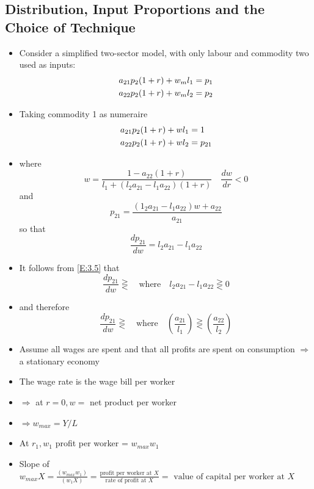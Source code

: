 \documentclass[a4paper,twoside]{article}
\numberwithin{equation}{section}
\numberwithin{figure}{section}
\begin{document}
\subsection{Distribution, Input Proportions and the Choice of Technique}
	\begin{itemize}
		\item Consider a simplified two-sector model, with only labour and commodity two used as inputs:
		\begin{align}
			a_{21}p_2 (1 + r) + w_m l_1 &= p_1 \notag \\
			a_{22}p_2 (1 + r) + w_m l_2 &= p_2 \label{E:3.1}
		\end{align}
		\item Taking commodity 1 as numeraire  
		\begin{align}
			a_{21}p_2 (1 + r) + w l_1 &= 1 \notag \\
			a_{22}p_2 (1 + r) + w l_2 &= p_{21} \label{E:3.2}
		\end{align}
		\item where
		\begin{equation}
			w = \frac{1 - a_{22} (1 + r)}{l_1 + (l_2 a_{21} - l_1 a_{22}) (1 + r)} \quad \frac{dw}{dr} < 0 \label{E:3.3}
		\end{equation}
		and
		\begin{equation}
			p_{21} = \frac{(1_2 a_{21} - l_1 a_{22}) w + a_{22}}{a_{21}} \label{E:3.4}
		\end{equation}
		so that
		\begin{equation}
			\frac{dp_{21}}{dw} = l_2 a_{21} - l_1 a_{22} \label{E:3.5}
		\end{equation}
		\item It follows from \cref{E:3.5} that
		\begin{equation}
			\frac{dp_{21}}{dw} \gtreqless \quad \text{where} \quad l_2 a_{21} - l_1 a_{22} \gtreqless 0 \label{E:3.6}
		\end{equation}
		\item and therefore
		\begin{equation}
			\frac{dp_{21}}{dw} \gtreqless \quad \text{where} \quad \left( \frac{a_{21}}{l_1} \right) \gtreqless \left( \frac{a_{22}}{l_2} \right) \label{E:3.7}
		\end{equation}
		\item Assume all wages are spent and that all profits are spent on consumption \( \Rightarrow \) a stationary economy 
		\item The wage rate is the wage bill per worker 
		\item \( \Rightarrow \) at \( r = 0, w = \) net product per worker
		\item \( \Rightarrow w_{max} = Y/L \)
		\item At \( r_1, w_1 \) profit per worker = \( w_{max} w_1 \)
		\item Slope of \( w_{max}X = \frac{(w_{max}w_1)}{(w_1 X)} = \frac{\text{profit per worker  at } X}{\text{rate of profit at } X} = \text{ value of capital per worker at } X \)
	\end{itemize}
\end{document}
